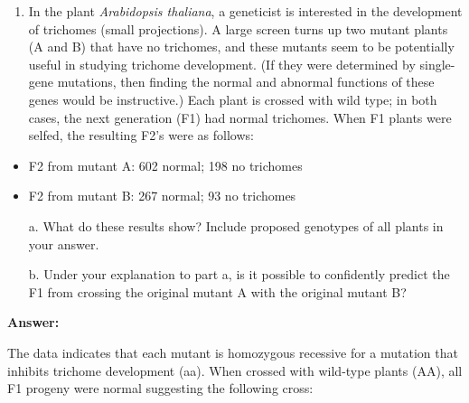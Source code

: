 \documentclass[11pt,]{article}
\providecommand{\tightlist}{%
  \setlength{\itemsep}{0pt}\setlength{\parskip}{0pt}}
\begin{document}
\begin{blackbox}

\begin{enumerate}
\def\labelenumi{\arabic{enumi}.}
\setcounter{enumi}{39}
\tightlist
\item
  In the plant \emph{Arabidopsis thaliana}, a geneticist is interested
  in the development of trichomes (small projections). A large screen
  turns up two mutant plants (A and B) that have no trichomes, and these
  mutants seem to be potentially useful in studying trichome
  development. (If they were determined by single-gene mutations, then
  finding the normal and abnormal functions of these genes would be
  instructive.) Each plant is crossed with wild type; in both cases, the
  next generation (F1) had normal trichomes. When F1 plants were selfed,
  the resulting F2's were as follows:
\end{enumerate}

\begin{itemize}
\tightlist
\item
  F2 from mutant A: 602 normal; 198 no trichomes
\item
  F2 from mutant B: 267 normal; 93 no trichomes
\end{itemize}

\begin{enumerate} 
 \item[a.]{ What do these results show? Include proposed genotypes of all plants in your answer. } 
 \item[b.]{ Under your explanation to part a, is it possible to confidently predict the F1 from crossing the original mutant A with the original mutant B?  } 
 \end{enumerate}

\textbf{Answer:}

The data indicates that each mutant is homozygous recessive for a
mutation that inhibits trichome development (aa). When crossed with
wild-type plants (AA), all F1 progeny were normal suggesting the
following cross:


\end{blackbox}
\end{document}
